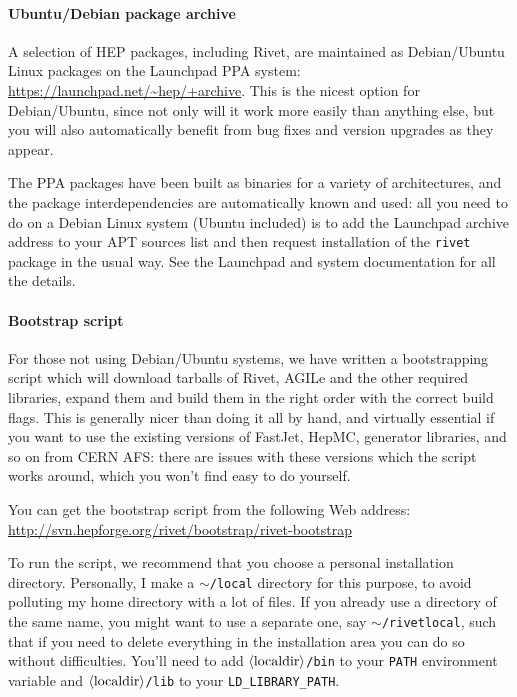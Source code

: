\documentclass{JHEP3}
\newcommand{\kbd}[1]{\texttt{#1}\xspace}
\newcommand{\var}[1]{\texttt{\textdollar{}#1}\xspace}
\newcommand{\val}[1]{\textit{\ensuremath{\langle\text{\textrm{#1}\/}\rangle}}\xspace}
\newcommand{\home}{\texttt{\ensuremath{\sim}}\xspace}
\begin{document}
\paragraph{Ubuntu/Debian package archive}

A selection of HEP packages, including Rivet, are maintained as Debian/Ubuntu
Linux packages on the Launchpad PPA system:
\url{https://launchpad.net/~hep/+archive}. This is the nicest option for
Debian/Ubuntu, since not only will it work more easily than anything else, but
you will also automatically benefit from bug fixes and version upgrades as they
appear.

The PPA packages have been built as binaries for a variety of architectures, and
the package interdependencies are automatically known and used: all you need to
do on a Debian Linux system (Ubuntu included) is to add the Launchpad archive
address to your APT sources list and then request installation of the
\kbd{rivet} package in the usual way. See the Launchpad and system documentation
for all the details.


\paragraph{Bootstrap script}

For those not using Debian/Ubuntu systems, we have written a bootstrapping
script which will download tarballs of Rivet, AGILe and the other required
libraries, expand them and build them in the right order with the correct build
flags. This is generally nicer than doing it all by hand, and virtually
essential if you want to use the existing versions of FastJet, HepMC, generator
libraries, and so on from CERN AFS: there are issues with these versions which
the script works around, which you won't find easy to do yourself.

You can get the bootstrap script from the following Web address:
\url{http://svn.hepforge.org/rivet/bootstrap/rivet-bootstrap}

To run the script, we recommend that you choose a personal installation
directory. Personally, I make a \kbd{\home/local} directory for this purpose, to
avoid polluting my home directory with a lot of files. If you already use a
directory of the same name, you might want to use a separate one, say
\kbd{\home/rivetlocal}, such that if you need to delete everything in the
installation area you can do so without difficulties. You'll need to add
\kbd{\val{localdir}/bin} to your \var{PATH} environment variable and
\kbd{\val{localdir}/lib} to your \var{LD_LIBRARY_PATH}.
\end{document}
